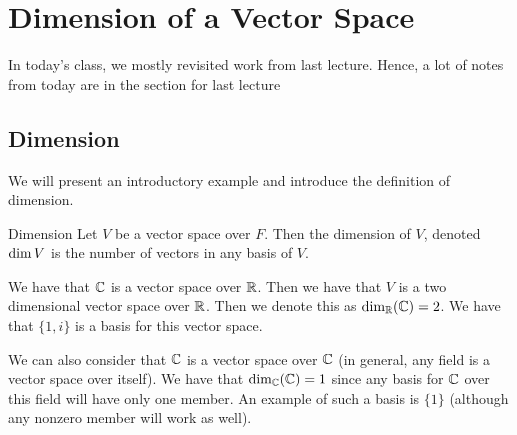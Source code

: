 \documentclass[main.tex]{subfiles}
\begin{document}
    \chapter{Dimension of a Vector Space}
    In today's class, we mostly revisited work from last lecture. Hence, a lot of notes from today are in the section for last lecture

    \section{Dimension}
    We will present an introductory example and introduce the definition of dimension. 
    \begin{defn}{Dimension}{}
        Let $V$ be a vector space over $F$. Then the dimension of $V$, denoted $\operatorname{dim} V$ is the number of vectors in any basis of $V$.
    \end{defn}
    \begin{example}{}{}
        We have that $\mathbb{C}$ is a vector space over $\mathbb{R}$. Then we have that $V$ is a two dimensional vector space over $\mathbb{R}$. Then we denote this as $\operatorname{dim}_{\mathbb{R}} (\mathbb{C}) = 2$. We have that $\{1, i\}$ is a basis for this vector space.\bigbreak 

        We can also consider that $\mathbb{C}$ is a vector space over $\mathbb{C}$ (in general, any field is a vector space over itself). We have that $\operatorname{dim}_{\mathbb{C}}(\mathbb{C}) = 1$ since any basis for $\mathbb{C}$ over this field will have only one member. An example of such a basis is $\{1\}$ (although any nonzero member will work as well). 
    \end{example}
\end{document}
